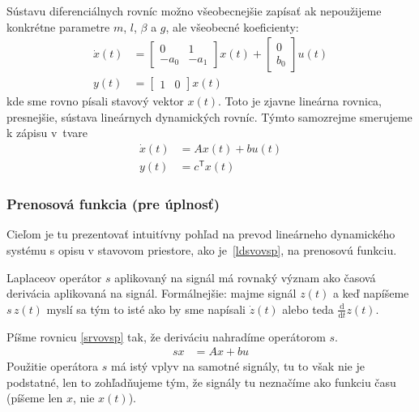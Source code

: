 \documentclass[a4paper, 10pt, ]{article}
\begin{document}
Sústavu diferenciálnych rovníc možno všeobecnejšie zapísať ak nepoužijeme konkrétne parametre $m$, $l$, $\beta$ a $g$, ale všeobecné koeficienty:
\begin{subequations}
    \begin{align}
    	\dot x(t)
    	&=
    	\begin{bmatrix}
    		0 & 1 \\
    		- a_0  & - a_1
    	\end{bmatrix}
    	x(t)
        +
        \begin{bmatrix}
    		0\\ b_0
    	\end{bmatrix}
        u(t)
        \\
        y(t) &= \begin{bmatrix} 1 & 0 \end{bmatrix} x(t)
    \end{align}
\end{subequations}
kde sme rovno písali stavový vektor $x(t)$. Toto je zjavne lineárna rovnica, presnejšie, sústava lineárnych dynamických rovníc. Týmto samozrejme smerujeme k zápisu v~tvare
\begin{subequations} \label{ldsvovsp}
    \begin{align}
    	\dot x(t) &= A x(t) + b u(t) \label{srvovsp} \\
        y(t) &= c^\mathsf T x(t)
    \end{align}
\end{subequations}





\subsubsection{Prenosová funkcia (pre úplnosť)}
\label{tdopiscast}

Cieľom je tu prezentovať intuitívny pohľad na prevod lineárneho dynamického systému s opisu v stavovom priestore, ako je~\eqref{ldsvovsp}, na prenosovú funkciu.

Laplaceov operátor $s$ aplikovaný na signál má rovnaký význam ako časová derivácia aplikovaná na signál. Formálnejšie: majme signál $z(t)$ a keď napíšeme $s\, z(t)$ myslí sa tým to isté ako by sme napísali $\dot z(t)$ alebo teda $\frac{\text{d}}{\text{d}t} z(t)$.

Píšme rovnicu \eqref{srvovsp} tak, že deriváciu nahradíme operátorom $s$.
\begin{align}
    s x &= A x + b u
\end{align}
Použitie operátora $s$ má istý vplyv na samotné signály, tu to však nie je podstatné, len to zohľadňujeme tým, že signály tu neznačíme ako funkciu času (píšeme len $x$, nie $x(t)$).
\end{document}
